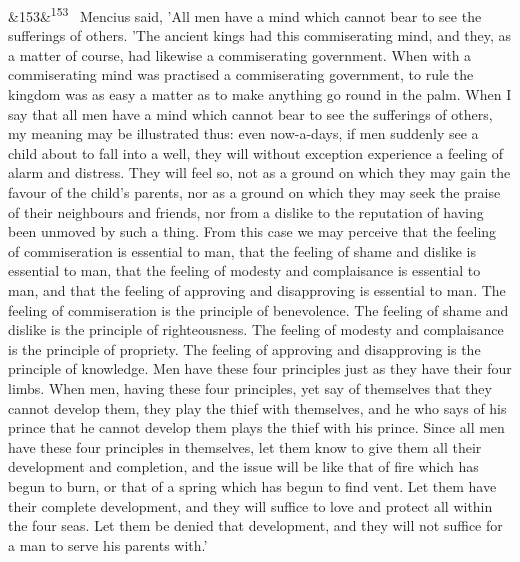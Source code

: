\documentclass[12pt]{article}
\newcommand{\para}[1][]{\par\noindent\ifx&#1&\else\textsuperscript{\footnotesize #1}~\fi}
\begin{document}
\para[153] Mencius said, 'All men have a mind which cannot bear to see the sufferings of others. 'The ancient kings had this commiserating mind, and they, as a matter of course, had likewise a commiserating government. When with a commiserating mind was practised a commiserating government, to rule the kingdom was as easy a matter as to make anything go round in the palm. When I say that all men have a mind which cannot bear to see the sufferings of others, my meaning may be illustrated thus: even now-a-days, if men suddenly see a child about to fall into a well, they will without exception experience a feeling of alarm and distress. They will feel so, not as a ground on which they may gain the favour of the child's parents, nor as a ground on which they may seek the praise of their neighbours and friends, nor from a dislike to the reputation of having been unmoved by such a thing. From this case we may perceive that the feeling of commiseration is essential to man, that the feeling of shame and dislike is essential to man, that the feeling of modesty and complaisance is essential to man, and that the feeling of approving and disapproving is essential to man. The feeling of commiseration is the principle of benevolence. The feeling of shame and dislike is the principle of righteousness. The feeling of modesty and complaisance is the principle of propriety. The feeling of approving and disapproving is the principle of knowledge. Men have these four principles just as they have their four limbs. When men, having these four principles, yet say of themselves that they cannot develop them, they play the thief with themselves, and he who says of his prince that he cannot develop them plays the thief with his prince. Since all men have these four principles in themselves, let them know to give them all their development and completion, and the issue will be like that of fire which has begun to burn, or that of a spring which has begun to find vent. Let them have their complete development, and they will suffice to love and protect all within the four seas. Let them be denied that development, and they will not suffice for a man to serve his parents with.'
\end{document}
